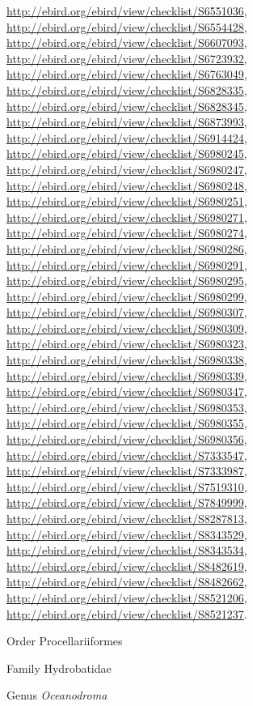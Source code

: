 \documentclass[9pt, article]{memoir}
\begin{document}
\begin{multicols}{2}
\url{http://ebird.org/ebird/view/checklist/S6551036}, 
\url{http://ebird.org/ebird/view/checklist/S6554428}, 
\url{http://ebird.org/ebird/view/checklist/S6607093}, 
\url{http://ebird.org/ebird/view/checklist/S6723932}, 
\url{http://ebird.org/ebird/view/checklist/S6763049}, 
\url{http://ebird.org/ebird/view/checklist/S6828335}, 
\url{http://ebird.org/ebird/view/checklist/S6828345}, 
\url{http://ebird.org/ebird/view/checklist/S6873993}, 
\url{http://ebird.org/ebird/view/checklist/S6914424}, 
\url{http://ebird.org/ebird/view/checklist/S6980245}, 
\url{http://ebird.org/ebird/view/checklist/S6980247}, 
\url{http://ebird.org/ebird/view/checklist/S6980248}, 
\url{http://ebird.org/ebird/view/checklist/S6980251}, 
\url{http://ebird.org/ebird/view/checklist/S6980271}, 
\url{http://ebird.org/ebird/view/checklist/S6980274}, 
\url{http://ebird.org/ebird/view/checklist/S6980286}, 
\url{http://ebird.org/ebird/view/checklist/S6980291}, 
\url{http://ebird.org/ebird/view/checklist/S6980295}, 
\url{http://ebird.org/ebird/view/checklist/S6980299}, 
\url{http://ebird.org/ebird/view/checklist/S6980307}, 
\url{http://ebird.org/ebird/view/checklist/S6980309}, 
\url{http://ebird.org/ebird/view/checklist/S6980323}, 
\url{http://ebird.org/ebird/view/checklist/S6980338}, 
\url{http://ebird.org/ebird/view/checklist/S6980339}, 
\url{http://ebird.org/ebird/view/checklist/S6980347}, 
\url{http://ebird.org/ebird/view/checklist/S6980353}, 
\url{http://ebird.org/ebird/view/checklist/S6980355}, 
\url{http://ebird.org/ebird/view/checklist/S6980356}, 
\url{http://ebird.org/ebird/view/checklist/S7333547}, 
\url{http://ebird.org/ebird/view/checklist/S7333987}, 
\url{http://ebird.org/ebird/view/checklist/S7519310}, 
\url{http://ebird.org/ebird/view/checklist/S7849999}, 
\url{http://ebird.org/ebird/view/checklist/S8287813}, 
\url{http://ebird.org/ebird/view/checklist/S8343529}, 
\url{http://ebird.org/ebird/view/checklist/S8343534}, 
\url{http://ebird.org/ebird/view/checklist/S8482619}, 
\url{http://ebird.org/ebird/view/checklist/S8482662}, 
\url{http://ebird.org/ebird/view/checklist/S8521206}, 
\url{http://ebird.org/ebird/view/checklist/S8521237}.

\vspace{6pt}\noindent\hspace{18pt}Order Procellariiformes


\vspace{6pt}\noindent\hspace{24pt}Family Hydrobatidae


\vspace{6pt}\noindent\hspace{30pt}Genus \textit{Oceanodroma}



\end{multicols}
\end{document}
